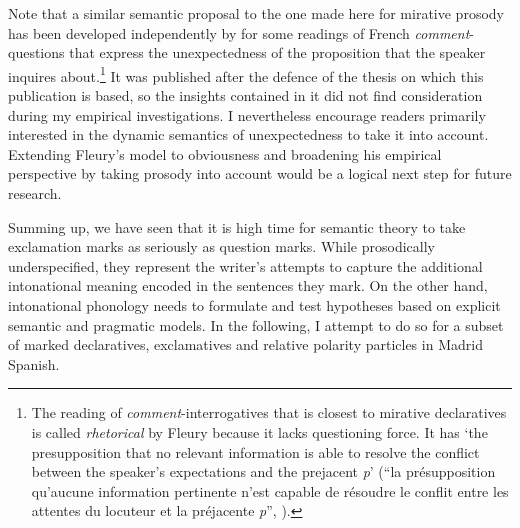 Note that a similar semantic proposal to the one made here for mirative pro\-so\-dy has been developed independently by \citet[195–230]{Fleury.2021} for some readings of French \textit{comment}-questions that express the unexpectedness of the proposition that the speaker inquires about.\footnote{The reading of \textit{comment}-interrogatives that is closest to mirative declaratives is called \textit{rhetorical} by Fleury because it lacks questioning force. It has `the presupposition that no relevant information is able to resolve the conflict between the speaker's expectations and the prejacent \textit{p}' (``la présupposition qu’aucune information pertinente n’est capable de résoudre le conflit entre les attentes du locuteur et la préjacente \textit{p}'', \citealt[52]{Fleury.2021}).} It was published after the defence of the thesis on which this publication is based, so the insights contained in it did not find consideration during my empirical investigations. I nevertheless encourage readers primarily interested in the dynamic semantics of unexpectedness to take it into account. Extending Fleury's model to obviousness and broadening his empirical perspective by taking prosody into account would be a logical next step for future research.

Summing up, we have seen that it is high time for semantic theory to take exclamation marks as seriously as question marks. While prosodically underspecified, they represent the writer's attempts to capture the additional intonational meaning encoded in the sentences they mark. On the other hand, intonational phonology needs to formulate and test hypotheses based on explicit semantic and pragmatic models. In the following, I attempt to do so for a subset of marked declaratives, exclamatives and relative polarity particles in Madrid Spanish.

